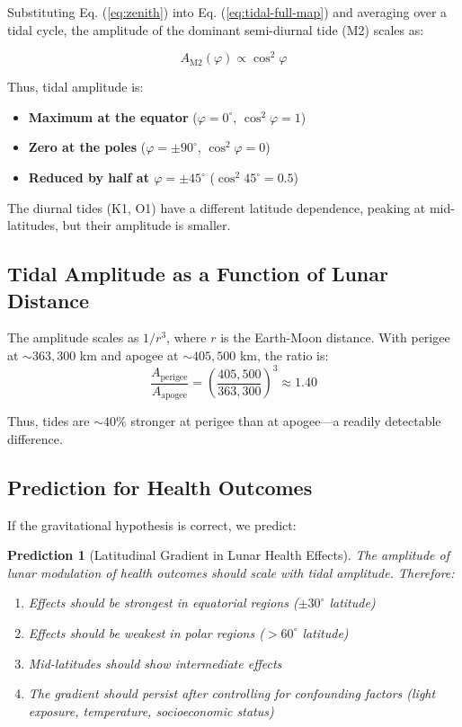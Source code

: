 \documentclass[12pt,a4paper]{article}
\newtheorem{prediction}[theorem]{Prediction}
\theoremstyle{remark}
\begin{document}
	Substituting Eq. (\ref{eq:zenith}) into Eq. (\ref{eq:tidal-full-map}) and averaging over a tidal cycle, the amplitude of the dominant semi-diurnal tide (M2) scales as:
	
	\begin{equation}
		A_{\text{M2}}(\varphi) \propto \cos^2\varphi
		\label{eq:amplitude-latitude}
	\end{equation}
	
	Thus, tidal amplitude is:
	\begin{itemize}
		\item \textbf{Maximum at the equator} ($\varphi = 0^\circ$, $\cos^2\varphi = 1$)
		\item \textbf{Zero at the poles} ($\varphi = \pm 90^\circ$, $\cos^2\varphi = 0$)
		\item \textbf{Reduced by half at $\varphi = \pm 45^\circ$} ($\cos^2 45^\circ = 0.5$)
	\end{itemize}
	
	The diurnal tides (K1, O1) have a different latitude dependence, peaking at mid-latitudes, but their amplitude is smaller.
	
	\subsection{Tidal Amplitude as a Function of Lunar Distance}
	
	The amplitude scales as $1/r^3$, where $r$ is the Earth-Moon distance. With perigee at $\sim 363,300$ km and apogee at $\sim 405,500$ km, the ratio is:
	\[
	\frac{A_{\text{perigee}}}{A_{\text{apogee}}} = \left(\frac{405,500}{363,300}\right)^3 \approx 1.40
	\]
	
	Thus, tides are $\sim 40\%$ stronger at perigee than at apogee—a readily detectable difference.
	
	\subsection{Prediction for Health Outcomes}
	
	If the gravitational hypothesis is correct, we predict:
	
	\begin{prediction}[Latitudinal Gradient in Lunar Health Effects]
		The amplitude of lunar modulation of health outcomes should scale with tidal amplitude. Therefore:
		\begin{enumerate}
			\item Effects should be strongest in equatorial regions ($\pm 30^\circ$ latitude)
			\item Effects should be weakest in polar regions ($>60^\circ$ latitude)
			\item Mid-latitudes should show intermediate effects
			\item The gradient should persist after controlling for confounding factors (light exposure, temperature, socioeconomic status)
		\end{enumerate}
	\end{prediction}
	
\end{document}
